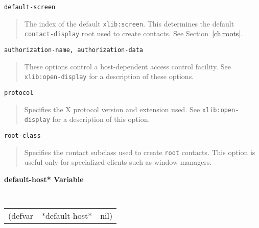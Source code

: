 \documentclass[twoside]{book}
\begin{document}
\begin{sloppy}
\begin{flushright}
{}\end{flushright}


\begin{flushright} \parbox[t]{6.125in}{
{\tt default-screen}
\begin{quote}
The index of the default {\tt xlib:screen}. This determines the default
{\tt contact-display} root
used to create contacts. See Section~\ref{ch:roots}.
\end{quote}

}\end{flushright}

\begin{flushright} \parbox[t]{6.125in}{
{\tt authorization-name, authorization-data}
\begin{quote}
These options control a host-dependent access control facility.
See {\tt xlib:open-display} for a
description of these options.
\end{quote}

}\end{flushright}

\begin{flushright} \parbox[t]{6.125in}{
{\tt protocol}
\begin{quote}
Specifies the X protocol version and extension used.
See {\tt xlib:open-display} for a
description of this option.
\end{quote}

}\end{flushright}

\begin{flushright} \parbox[t]{6.125in}{
{\tt root-class}
\begin{quote}
Specifies the contact subclass used to create {\tt root} contacts.
This option is useful only for specialized clients such
as window managers.
\end{quote}

}\end{flushright}

{\samepage
{\large {\bf *default-host* \hfill Variable}} 
\begin{flushright} \parbox[t]{6.125in}{
\tt
\begin{tabular}{lll}
\raggedright
(defvar & *default-host* & nil)
\end{tabular}
\rm

}\end{flushright}}


\end{sloppy}
\end{document}
